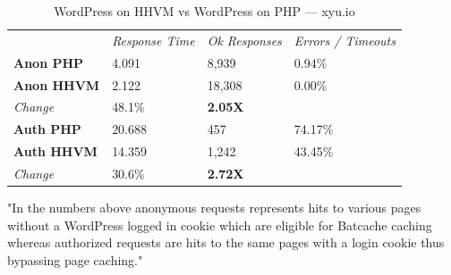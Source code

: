 \begin{table}[H]
\begin{tabular}{llll}
                   & \textit{Response Time} & \textit{Ok Responses} & \textit{Errors / Timeouts} \\
\textbf{Anon PHP}  & 4.091                  & 8,939                 & 0.94\%                     \\
\textbf{Anon HHVM} & 2.122                  & 18,308                & 0.00\%                     \\
\textit{Change}    & 48.1\%                 & \textbf{2.05X}        &                            \\
\textbf{Auth PHP}  & 20.688                 & 457                   & 74.17\%                    \\
\textbf{Auth HHVM} & 14.359                 & 1,242                 & 43.45\%                    \\
\textit{Change}    & 30.6\%                 & \textbf{2.72X}        &                           
\end{tabular}
\caption{WordPress on HHVM vs WordPress on PHP — xyu.io}
\label{tab:xyu.io-experiment-results}
\end{table} 
"In the numbers above anonymous requests represents hits to various pages without a WordPress logged in cookie which are eligible for Batcache caching whereas authorized requests are hits to the same pages with a login cookie thus bypassing page caching."\cite{Study:Perf-XYU.io}


